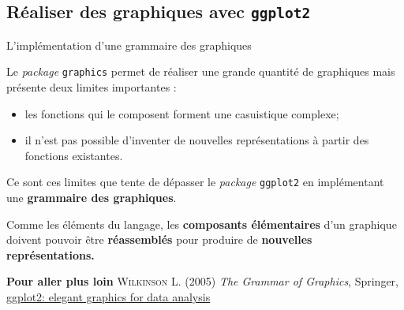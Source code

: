 \documentclass[12pt,ignorenonframetext,]{beamer}
\providecommand{\tightlist}{%
  \setlength{\itemsep}{0pt}\setlength{\parskip}{0pt}}
\newcommand{\intertitre}[1]{\textcolor{redInsee}{\textbf{#1}}}
\begin{document}
\hypertarget{realiser-des-graphiques-avec}{%
\subsection{\texorpdfstring{Réaliser des graphiques avec
\protect\texttt{ggplot2}}{Réaliser des graphiques avec }}\label{realiser-des-graphiques-avec}}

\begin{frame}[fragile]{\large L’implémentation d’une grammaire des
graphiques}
\protect\hypertarget{limplementation-dune-grammaire-des-graphiques}{}

Le \emph{package} \texttt{graphics} permet de réaliser une grande
quantité de graphiques mais présente deux limites importantes :

\begin{itemize}
\tightlist
\item
  les fonctions qui le composent forment une casuistique complexe;
\item
  il n’est pas possible d’inventer de nouvelles représentations à partir
  des fonctions existantes.
\end{itemize}

\pause Ce sont ces limites que tente de dépasser le \emph{package}
\texttt{ggplot2} en implémentant une \textbf{grammaire des graphiques}.

Comme les éléments du langage, les \textbf{composants élémentaires} d’un
graphique doivent pouvoir être \textbf{réassemblés} pour produire de
\textbf{nouvelles représentations.}

\pause

\intertitre{Pour aller plus loin} \textsc{Wilkinson L.} (2005)
\textit{The Grammar of Graphics}, Springer,
\href{https://github.com/hadley/ggplot2-book}{\underline{ggplot2: elegant graphics for data analysis}}

\end{frame}
\end{document}
